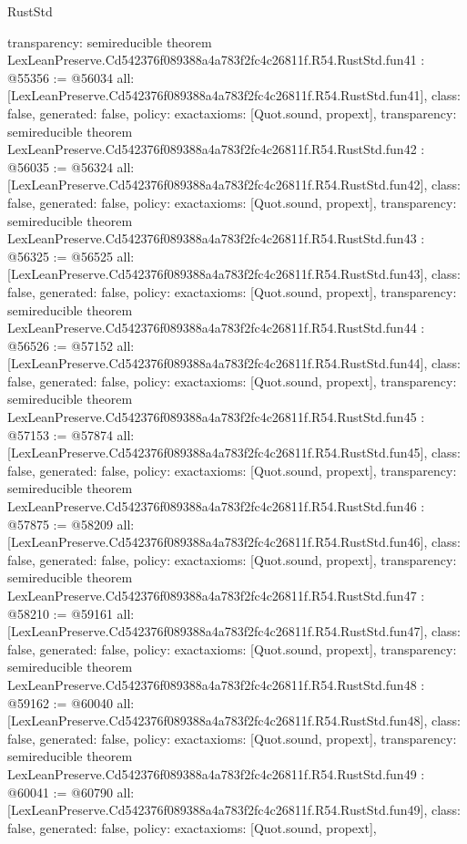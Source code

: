 \begin{lexlean}{RustStd}
\begin{coremodule}
{  transparency: semireducible
}
theorem LexLeanPreserve.Cd542376f089388a4a783f2fc4c26811f.R54.RustStd.fun41 : @55356 := @56034 {
  all: [LexLeanPreserve.Cd542376f089388a4a783f2fc4c26811f.R54.RustStd.fun41],
  class: false,
  generated: false,
  policy: exact{axioms: [Quot.sound, propext]},
  transparency: semireducible
}
theorem LexLeanPreserve.Cd542376f089388a4a783f2fc4c26811f.R54.RustStd.fun42 : @56035 := @56324 {
  all: [LexLeanPreserve.Cd542376f089388a4a783f2fc4c26811f.R54.RustStd.fun42],
  class: false,
  generated: false,
  policy: exact{axioms: [Quot.sound, propext]},
  transparency: semireducible
}
theorem LexLeanPreserve.Cd542376f089388a4a783f2fc4c26811f.R54.RustStd.fun43 : @56325 := @56525 {
  all: [LexLeanPreserve.Cd542376f089388a4a783f2fc4c26811f.R54.RustStd.fun43],
  class: false,
  generated: false,
  policy: exact{axioms: [Quot.sound, propext]},
  transparency: semireducible
}
theorem LexLeanPreserve.Cd542376f089388a4a783f2fc4c26811f.R54.RustStd.fun44 : @56526 := @57152 {
  all: [LexLeanPreserve.Cd542376f089388a4a783f2fc4c26811f.R54.RustStd.fun44],
  class: false,
  generated: false,
  policy: exact{axioms: [Quot.sound, propext]},
  transparency: semireducible
}
theorem LexLeanPreserve.Cd542376f089388a4a783f2fc4c26811f.R54.RustStd.fun45 : @57153 := @57874 {
  all: [LexLeanPreserve.Cd542376f089388a4a783f2fc4c26811f.R54.RustStd.fun45],
  class: false,
  generated: false,
  policy: exact{axioms: [Quot.sound, propext]},
  transparency: semireducible
}
theorem LexLeanPreserve.Cd542376f089388a4a783f2fc4c26811f.R54.RustStd.fun46 : @57875 := @58209 {
  all: [LexLeanPreserve.Cd542376f089388a4a783f2fc4c26811f.R54.RustStd.fun46],
  class: false,
  generated: false,
  policy: exact{axioms: [Quot.sound, propext]},
  transparency: semireducible
}
theorem LexLeanPreserve.Cd542376f089388a4a783f2fc4c26811f.R54.RustStd.fun47 : @58210 := @59161 {
  all: [LexLeanPreserve.Cd542376f089388a4a783f2fc4c26811f.R54.RustStd.fun47],
  class: false,
  generated: false,
  policy: exact{axioms: [Quot.sound, propext]},
  transparency: semireducible
}
theorem LexLeanPreserve.Cd542376f089388a4a783f2fc4c26811f.R54.RustStd.fun48 : @59162 := @60040 {
  all: [LexLeanPreserve.Cd542376f089388a4a783f2fc4c26811f.R54.RustStd.fun48],
  class: false,
  generated: false,
  policy: exact{axioms: [Quot.sound, propext]},
  transparency: semireducible
}
theorem LexLeanPreserve.Cd542376f089388a4a783f2fc4c26811f.R54.RustStd.fun49 : @60041 := @60790 {
  all: [LexLeanPreserve.Cd542376f089388a4a783f2fc4c26811f.R54.RustStd.fun49],
  class: false,
  generated: false,
  policy: exact{axioms: [Quot.sound, propext]},
}
\end{coremodule}
\end{lexlean}

